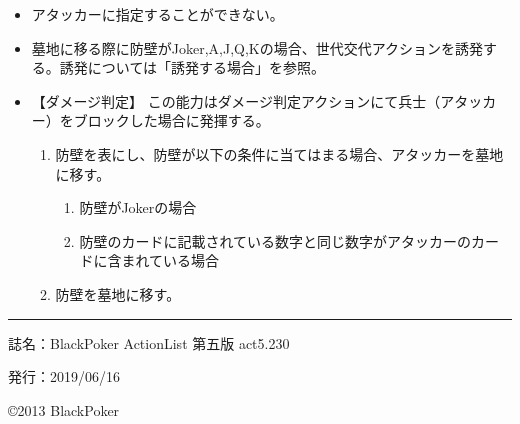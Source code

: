 \documentclass[twocolumn,a5paper,papersize,10pt]{jarticle}
\begin{document}
\vspace{-1zh}%
\begin{itemize}
\setlength{\leftskip}{-0.3cm}
\setlength{\parskip}{0pt} %

\item アタッカーに指定することができない。

\item 墓地に移る際に防壁がJoker,A,J,Q,Kの場合、世代交代アクションを誘発する。誘発については「誘発する場合」を参照。

\item 【ダメージ判定】 この能力はダメージ判定アクションにて兵士（アタッカー）をブロックした場合に発揮する。

\vspace{-1zh}%
\begin{enumerate}
\setlength{\leftskip}{-0.3cm}
\setlength{\parskip}{0pt} %

\item 防壁を表にし、防壁が以下の条件に当てはまる場合、アタッカーを墓地に移す。

\begin{enumerate}
\renewcommand{\labelenumi}{\Alph{enumi}}
\setlength{\leftskip}{-0.3cm}
\setlength{\parskip}{0pt} %

\item 防壁がJokerの場合

\item 防壁のカードに記載されている数字と同じ数字がアタッカーのカードに含まれている場合

\end{enumerate}
\item 防壁を墓地に移す。
\vspace{-1zh}%
\end{enumerate}\vspace{-1zh}%
\end{itemize}


\thispagestyle{empty}
\begin{flushright}
\begin{minipage}{0.8\hsize}
\hrule height 0.2mm depth 0mm width 50mm %
\begin{description}
  \item{誌名：}BlackPoker ActionList 第五版 act5.230
  \item{発行：}2019/06/16
\end{description}
\end{minipage}
\end{flushright}

\begin{flushright}
\copyright 2013 BlackPoker
\end{flushright}
\end{document}
